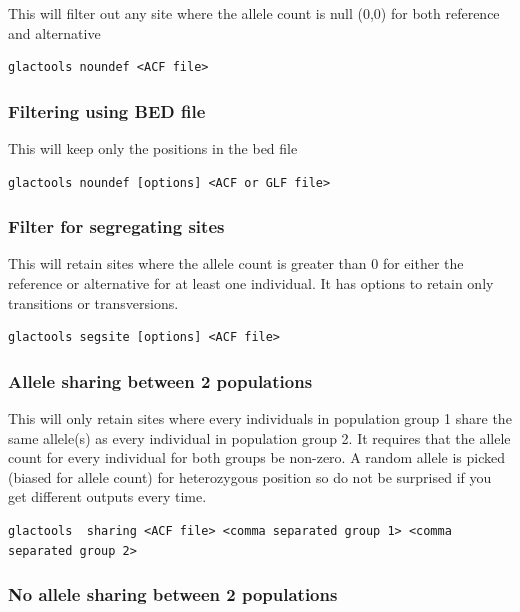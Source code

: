 \documentclass[a4paper]{article}
\begin{document}
\noindent This will filter out any site where the allele count is null (0,0) for both reference and alternative

\begin{lstlisting}
glactools noundef <ACF file>
\end{lstlisting}


\subsubsection{Filtering using BED file}

\noindent This will keep only the positions in the bed file

\begin{lstlisting}
glactools noundef [options] <ACF or GLF file>
\end{lstlisting}

\subsubsection{Filter for segregating sites}

\noindent This will retain sites where the allele count is greater than 0 for either the reference or alternative for at least one individual. It has options to retain only transitions or transversions. 

\begin{lstlisting}
glactools segsite [options] <ACF file>
\end{lstlisting}

\subsubsection{Allele sharing between 2 populations}

\noindent This will only retain sites where every individuals in population group 1 share the same allele(s) as every individual in population group 2.
It requires that the allele count for every individual for both groups be non-zero.
A random allele is picked (biased for allele count) for heterozygous position so do not be surprised if you get different outputs every time.

\tiny
\begin{lstlisting}
glactools  sharing <ACF file> <comma separated group 1> <comma separated group 2>
\end{lstlisting}
\normalsize

\subsubsection{No allele sharing between 2 populations}
\end{document}
